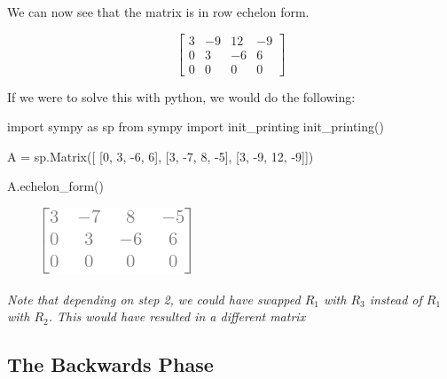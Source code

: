\documentclass[
  letterpaper,
  DIV=11,
  numbers=noendperiod]{scrreprt}
\newenvironment{Shaded}{\begin{snugshade}}{\end{snugshade}}
\newcommand{\DecValTok}[1]{\textcolor[rgb]{0.68,0.00,0.00}{#1}}
\newcommand{\ImportTok}[1]{\textcolor[rgb]{0.00,0.46,0.62}{#1}}
\newcommand{\NormalTok}[1]{\textcolor[rgb]{0.00,0.23,0.31}{#1}}
\newcommand{\OperatorTok}[1]{\textcolor[rgb]{0.37,0.37,0.37}{#1}}
\begin{document}
We can now see that the matrix is in row echelon form.

\[
\begin{bmatrix}
    3 & -9 & 12 & -9 \\
    0 & 3 & -6 & 6 \\
    0 & 0 & 0 & 0
\end{bmatrix}
\]

If we were to solve this with python, we would do the following:

\begin{Shaded}
\begin{Highlighting}[]
\ImportTok{import}\NormalTok{ sympy }\ImportTok{as}\NormalTok{ sp  }
\ImportTok{from}\NormalTok{ sympy }\ImportTok{import}\NormalTok{ init\_printing}
\NormalTok{init\_printing()}

\NormalTok{A }\OperatorTok{=}\NormalTok{ sp.Matrix([}
\NormalTok{    [}\DecValTok{0}\NormalTok{,  }\DecValTok{3}\NormalTok{,  }\OperatorTok{{-}}\DecValTok{6}\NormalTok{,   }\DecValTok{6}\NormalTok{], }
\NormalTok{    [}\DecValTok{3}\NormalTok{, }\OperatorTok{{-}}\DecValTok{7}\NormalTok{,   }\DecValTok{8}\NormalTok{,  }\OperatorTok{{-}}\DecValTok{5}\NormalTok{], }
\NormalTok{    [}\DecValTok{3}\NormalTok{, }\OperatorTok{{-}}\DecValTok{9}\NormalTok{,  }\DecValTok{12}\NormalTok{,  }\OperatorTok{{-}}\DecValTok{9}\NormalTok{]])}

\NormalTok{A.echelon\_form()}
\end{Highlighting}
\end{Shaded}

\begin{figure}[H]

{\centering \includegraphics{p2_files/figure-pdf/cell-2-output-1.png}

}

\end{figure}

\emph{Note that depending on step 2, we could have swapped \(R_1\) with
\(R_3\) instead of \(R_1\) with \(R_2\). This would have resulted in a
different matrix}

\hypertarget{the-backwards-phase}{%
\subsection*{The Backwards Phase}\label{the-backwards-phase}}
\end{document}
